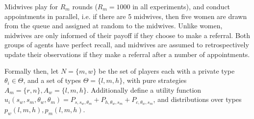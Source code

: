 Midwives play for \(R_{m}\) rounds (\(R_{m}=1000\) in all experiments), and conduct appointments in parallel, i.e. if there are 5 midwives, then five women are drawn from the queue and assigned at random to the midwives. 
Unlike women, midwives are only informed of their payoff if they choose to make a referral. Both groups of agents have perfect recall, and midwives are assumed to retrospectively update their observations if they make a referral after a number of appointments.


Formally then, let \(N = \{m, w\}\) be the set of players each with a private type \(\theta_{i} \in \Theta\), and a set of types \(\Theta=\{l, m, h\}\), with pure strategies \(A_{m}=\{r,n\}, A_{w}=\{l, m, h\}\). Additionally define a utility function \(u_{i}(s_{w}, s_{m}, \theta_{w}, \theta_{m})=P_{s, s_{w}, \theta_{m}} + P_{h, \theta_{w}, s_{m}} + P_{c, \theta_{w}, s_{m}}\), and distributions over types \(p_{w}(l, m, h), p_{m}(l, m, h)\).

\begin{table}
\center
{}



\caption{Payoff matrices\label{tab:Payoff-matrix}}
\end{table}


